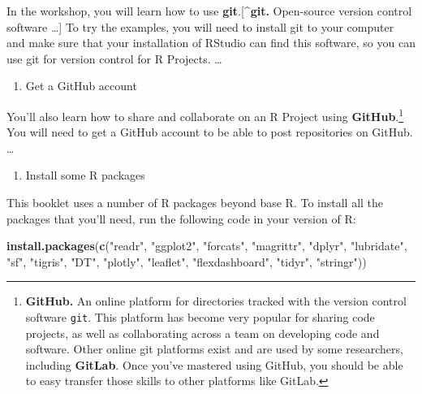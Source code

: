 \documentclass[]{tufte-book}
\newenvironment{Shaded}{}{}
\newcommand{\KeywordTok}[1]{\textcolor[rgb]{0.00,0.44,0.13}{\textbf{#1}}}
\newcommand{\NormalTok}[1]{#1}
\newcommand{\StringTok}[1]{\textcolor[rgb]{0.25,0.44,0.63}{#1}}
\providecommand{\tightlist}{%
  \setlength{\itemsep}{0pt}\setlength{\parskip}{0pt}}
\begin{document}
In the workshop, you will learn how to use \textbf{git}.{[}\^{}\textbf{git.} Open-source version control
software \ldots{}{]} To try the examples, you will need to install git to your computer and make
sure that your installation of RStudio can find this software, so you can use git for version
control for R Projects. \ldots{}

\begin{enumerate}
\def\labelenumi{\arabic{enumi}.}
\setcounter{enumi}{1}
\tightlist
\item
  Get a GitHub account
\end{enumerate}

You'll also learn how to share and collaborate on an R Project using \textbf{GitHub}.\footnote{\textbf{GitHub.}
  An online platform for directories tracked with
  the version control software \texttt{git}. This platform has become
  very popular for sharing code projects, as well as collaborating across a team on developing
  code and software. Other online git platforms exist and are used by some researchers,
  including \textbf{GitLab}. Once you've mastered using GitHub, you should be able to easy
  transfer those skills to other platforms like GitLab.} You will need to get a GitHub
account to be able to post repositories on GitHub. \ldots{}

\begin{enumerate}
\def\labelenumi{\arabic{enumi}.}
\setcounter{enumi}{2}
\tightlist
\item
  Install some R packages
\end{enumerate}

This booklet uses a number of R packages beyond base R. To install all the packages that you'll
need, run the following code in your version of R:

\begin{Shaded}
\begin{Highlighting}[]
\KeywordTok{install.packages}\NormalTok{(}\KeywordTok{c}\NormalTok{(}\StringTok{"readr"}\NormalTok{, }\StringTok{"ggplot2"}\NormalTok{, }\StringTok{"forcats"}\NormalTok{, }
    \StringTok{"magrittr"}\NormalTok{, }\StringTok{"dplyr"}\NormalTok{, }\StringTok{"lubridate"}\NormalTok{, }\StringTok{"sf"}\NormalTok{, }\StringTok{"tigris"}\NormalTok{, }
    \StringTok{"DT"}\NormalTok{, }\StringTok{"plotly"}\NormalTok{, }\StringTok{"leaflet"}\NormalTok{, }\StringTok{"flexdashboard"}\NormalTok{, }
    \StringTok{"tidyr"}\NormalTok{, }\StringTok{"stringr"}\NormalTok{))}
\end{Highlighting}
\end{Shaded}
\end{document}
